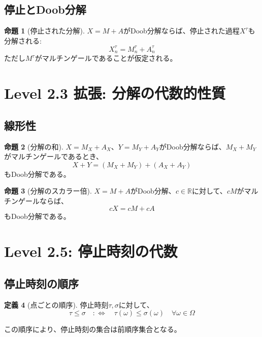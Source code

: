 \documentclass[a4paper,12pt]{ltjsarticle}
\theoremstyle{definition}
\newtheorem{definition}{定義}[section]
\newtheorem{proposition}[definition]{命題}
\begin{document}
\subsection{停止とDoob分解}

\begin{proposition}[停止された分解]
$X = M + A$がDoob分解ならば、停止された過程$X^\tau$も分解される:
\[
  X^\tau_n = M^\tau_n + A^\tau_n
\]
ただし$M^\tau$がマルチンゲールであることが仮定される。
\end{proposition}

\section{Level 2.3 拡張: 分解の代数的性質}

\subsection{線形性}

\begin{proposition}[分解の和]
$X = M_X + A_X$、$Y = M_Y + A_Y$がDoob分解ならば、$M_X + M_Y$がマルチンゲールであるとき、
\[
  X + Y = (M_X + M_Y) + (A_X + A_Y)
\]
もDoob分解である。
\end{proposition}

\begin{proposition}[分解のスカラー倍]
$X = M + A$がDoob分解、$c \in \mathbb{R}$に対して、$cM$がマルチンゲールならば、
\[
  cX = cM + cA
\]
もDoob分解である。
\end{proposition}

\section{Level 2.5: 停止時刻の代数}

\subsection{停止時刻の順序}

\begin{definition}[点ごとの順序]
停止時刻$\tau, \sigma$に対して、
\[
  \tau \leq \sigma \quad :\Leftrightarrow \quad \tau(\omega) \leq \sigma(\omega) \quad \forall \omega \in \Omega
\]
\end{definition}

この順序により、停止時刻の集合は前順序集合となる。
\end{document}
